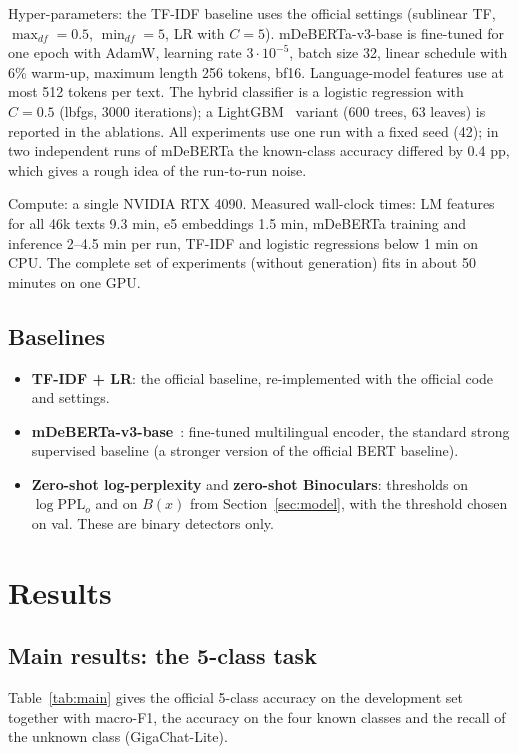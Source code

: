 \documentclass{article}
\begin{document}
Hyper-parameters: the TF-IDF baseline uses the official settings (sublinear TF, $\max_{df}=0.5$, $\min_{df}=5$, LR with $C=5$). mDeBERTa-v3-base is fine-tuned for one epoch with AdamW, learning rate $3\cdot10^{-5}$, batch size 32, linear schedule with 6\% warm-up, maximum length 256 tokens, bf16. Language-model features use at most 512 tokens per text. The hybrid classifier is a logistic regression with $C=0.5$ (lbfgs, 3000 iterations); a LightGBM~\cite{lightgbm} variant (600 trees, 63 leaves) is reported in the ablations. All experiments use one run with a fixed seed (42); in two independent runs of mDeBERTa the known-class accuracy differed by 0.4 pp, which gives a rough idea of the run-to-run noise.

Compute: a single NVIDIA RTX 4090. Measured wall-clock times: LM features for all 46k texts 9.3 min, e5 embeddings 1.5 min, mDeBERTa training and inference 2--4.5 min per run, TF-IDF and logistic regressions below 1 min on CPU. The complete set of experiments (without generation) fits in about 50 minutes on one GPU.

\subsection{Baselines}
\begin{itemize}
\item \textbf{TF-IDF + LR}: the official baseline, re-implemented with the official code and settings.
\item \textbf{mDeBERTa-v3-base}~\cite{deberta3}: fine-tuned multilingual encoder, the standard strong supervised baseline (a stronger version of the official BERT baseline).
\item \textbf{Zero-shot log-perplexity} and \textbf{zero-shot Binoculars}: thresholds on $\log\mathrm{PPL}_o$ and on $B(x)$ from Section~\ref{sec:model}, with the threshold chosen on val. These are binary detectors only.
\end{itemize}



\section{Results}
\label{sec:results}

\subsection{Main results: the 5-class task}
Table~\ref{tab:main} gives the official 5-class accuracy on the development set together with macro-F1, the accuracy on the four known classes and the recall of the unknown class (GigaChat-Lite).
\end{document}
